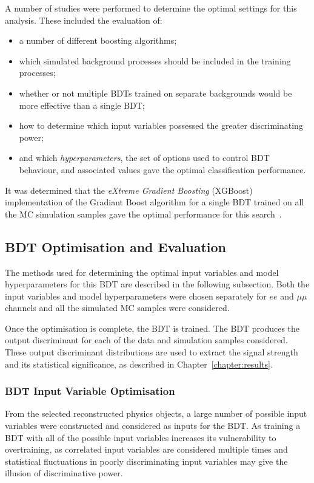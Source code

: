 A number of studies were performed to determine the optimal settings for this analysis.
These included the evaluation of:

\begin{itemize}
\item a number of different boosting algorithms;
\item which simulated background processes should be included in the training processes;
\item whether or not multiple BDTs trained on separate backgrounds would be more effective than a single BDT;
\item how to determine which input variables possessed the greater discriminating power;
\item and which \emph{hyperparameters}, the set of options used to control BDT behaviour, and associated values gave the optimal classification performance.
\end{itemize}

It was determined that the \emph{eXtreme Gradient Boosting} (XGBoost) implementation of the Gradiant Boost algorithm for a single BDT trained on all the MC simulation samples gave the optimal performance for this search~\cite{xgboost}.

\subsection{BDT Optimisation and Evaluation}
The methods used for determining the optimal input variables and model hyperparameters for this BDT are described in the following subsection.
Both the input variables and model hyperparameters were chosen separately for $ee$ and $\mu\mu$ channels and all the simulated MC samples were considered.

Once the optimisation is complete, the BDT is trained.
The BDT produces the output discriminant for each of the data and simulation samples considered.
These output discriminant distributions are used to extract the signal strength and its statistical significance, as described in Chapter~\ref{chapter:results}.

\subsubsection*{BDT Input Variable Optimisation}
From the selected reconstructed physics objects, a large number of possible input variables were constructed and considered as inputs for the BDT.
As training a BDT with all of the possible input variables increases its vulnerability to overtraining, as correlated input variables are considered multiple times and statistical fluctuations in poorly discriminating input variables may give the illusion of discriminative power.

